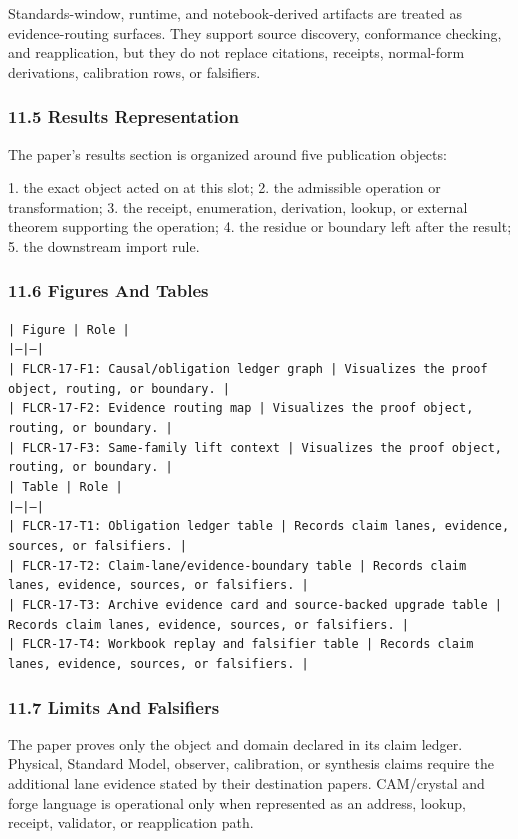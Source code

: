 \documentclass[11pt]{article}
\begin{document}
Standards-window, runtime, and notebook-derived artifacts are treated
as evidence-routing surfaces. They support source discovery, conformance
checking, and reapplication, but they do not replace citations, receipts,
normal-form derivations, calibration rows, or falsifiers.

\subsubsection*{11.5 Results Representation}

The paper's results section is organized around five publication objects:

1. the exact object acted on at this slot;
2. the admissible operation or transformation;
3. the receipt, enumeration, derivation, lookup, or external theorem supporting
   the operation;
4. the residue or boundary left after the result;
5. the downstream import rule.

\subsubsection*{11.6 Figures And Tables}

\noindent\texttt{| Figure | Role |}\\
\noindent\texttt{|---|---|}\\
\noindent\texttt{| FLCR-17-F1: Causal/obligation ledger graph | Visualizes the proof object, routing, or boundary. |}\\
\noindent\texttt{| FLCR-17-F2: Evidence routing map | Visualizes the proof object, routing, or boundary. |}\\
\noindent\texttt{| FLCR-17-F3: Same-family lift context | Visualizes the proof object, routing, or boundary. |}\\

\noindent\texttt{| Table | Role |}\\
\noindent\texttt{|---|---|}\\
\noindent\texttt{| FLCR-17-T1: Obligation ledger table | Records claim lanes, evidence, sources, or falsifiers. |}\\
\noindent\texttt{| FLCR-17-T2: Claim-lane/evidence-boundary table | Records claim lanes, evidence, sources, or falsifiers. |}\\
\noindent\texttt{| FLCR-17-T3: Archive evidence card and source-backed upgrade table | Records claim lanes, evidence, sources, or falsifiers. |}\\
\noindent\texttt{| FLCR-17-T4: Workbook replay and falsifier table | Records claim lanes, evidence, sources, or falsifiers. |}\\

\subsubsection*{11.7 Limits And Falsifiers}

The paper proves only the object and domain declared in its claim ledger.
Physical, Standard Model, observer, calibration, or synthesis claims require
the additional lane evidence stated by their destination papers. CAM/crystal
and forge language is operational only when represented as an address, lookup,
receipt, validator, or reapplication path.
\end{document}
